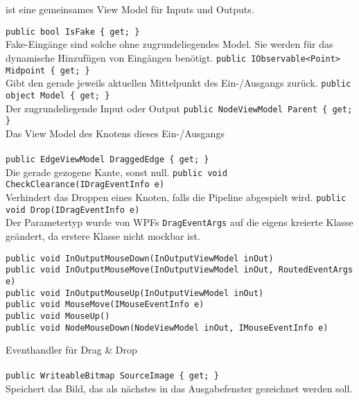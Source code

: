 \paragraph{}~\\
 ist eine gemeinsames View Model für Inputs und Outputs.
\begin{itemize}
	\add \verb!public bool IsFake { get; }! \\
	Fake-Eingänge sind solche ohne zugrundeliegendes Model. Sie werden für das dynamische Hinzufügen von Eingängen benötigt.
	\add \verb!public IObservable<Point> Midpoint { get; }! \\
	Gibt den gerade jeweils aktuellen Mittelpunkt des Ein-/Ausgangs zurück.
	\add \verb!public object Model { get; }! \\
	Der zugrundeliegende Input oder Output
	\add \verb!public NodeViewModel Parent { get; }! \\
	Das View Model des Knotens dieses Ein-/Ausgangs
\end{itemize}

\paragraph{}
\begin{itemize}
	\add \verb!public EdgeViewModel DraggedEdge { get; }! \\
	Die gerade gezogene Kante, sonst null.
	\add \verb!public void CheckClearance(IDragEventInfo e)! \\
	Verhindert das Droppen eines Knoten, falls die Pipeline abgespielt wird.
	\change \verb!public void Drop(IDragEventInfo e)! \\
	Der Parametertyp wurde von WPFs \verb!DragEventArgs! auf die eigens kreierte Klasse  geändert, da erstere Klasse nicht mockbar ist.
	\add \begin{verbatim}
public void InOutputMouseDown(InOutputViewModel inOut)
public void InOutputMouseMove(InOutputViewModel inOut, RoutedEventArgs e)
public void InOutputMouseUp(InOutputViewModel inOut)
public void MouseMove(IMouseEventInfo e)
public void MouseUp()
public void NodeMouseDown(NodeViewModel inOut, IMouseEventInfo e)
	\end{verbatim}
	Eventhandler für Drag \& Drop
\end{itemize}

\paragraph{}
\begin{itemize}
	\add \verb!public WriteableBitmap SourceImage { get; }! \\
	Speichert das Bild, das als nächstes in das Ausgabefenster gezeichnet werden soll.
\end{itemize}

